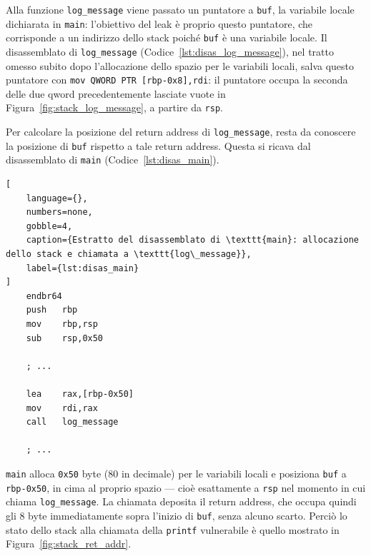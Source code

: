 Alla funzione \texttt{log\_message} viene passato un puntatore a \texttt{buf}, la variabile locale dichiarata in \texttt{main}: l'obiettivo del leak è proprio questo puntatore, che corrisponde a un indirizzo dello stack poiché \texttt{buf} è una variabile locale. Il disassemblato di \texttt{log\_message} (Codice~\ref{lst:disas_log_message}), nel tratto omesso subito dopo l'allocazione dello spazio per le variabili locali, salva questo puntatore con \texttt{mov QWORD PTR [rbp-0x8],rdi}: il puntatore occupa la seconda delle due qword precedentemente lasciate vuote in Figura~\ref{fig:stack_log_message}, a partire da \texttt{rsp}.

Per calcolare la posizione del return address di \texttt{log\_message}, resta da conoscere la posizione di \texttt{buf} rispetto a tale return address. Questa si ricava dal disassemblato di \texttt{main} (Codice~\ref{lst:disas_main}).
\begin{lstlisting}[
    language={},
    numbers=none,
    gobble=4,
    caption={Estratto del disassemblato di \texttt{main}: allocazione dello stack e chiamata a \texttt{log\_message}},
    label={lst:disas_main}
]
    endbr64
    push   rbp
    mov    rbp,rsp
    sub    rsp,0x50

    ; ...

    lea    rax,[rbp-0x50]
    mov    rdi,rax
    call   log_message

    ; ...
\end{lstlisting}
\texttt{main} alloca \texttt{0x50} byte (80 in decimale) per le variabili locali e posiziona \texttt{buf} a \texttt{rbp-0x50}, in cima al proprio spazio --- cioè esattamente a \texttt{rsp} nel momento in cui chiama \texttt{log\_message}. La chiamata deposita il return address, che occupa quindi gli 8 byte immediatamente sopra l'inizio di \texttt{buf}, senza alcuno scarto. Perciò lo stato dello stack alla chiamata della \texttt{printf} vulnerabile è quello mostrato in Figura~\ref{fig:stack_ret_addr}.

